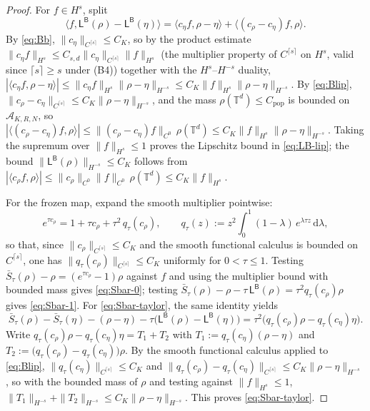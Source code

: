 \documentclass[a4paper,fleqn]{cas-sc}
\theoremstyle{definition}
\theoremstyle{remark}
\begin{document}
\begin{proof}
For $f\in H^s$, split
\[
\langle f,\mathsf L^{\mathsf B}(\rho)-\mathsf L^{\mathsf B}(\eta)\rangle
=\langle c_\eta f,\rho-\eta\rangle+\langle (c_\rho-c_\eta)f,\rho\rangle .
\]
By \eqref{eq:Bb}, $\|c_\eta\|_{C^{\lceil s\rceil}}\le C_K$, so by the product estimate
$\|c_\eta f\|_{H^s}\le C_{s,d}\|c_\eta\|_{C^{\lceil s\rceil}}\|f\|_{H^s}$ (the multiplier
property of $C^{\lceil s\rceil}$ on $H^s$, valid since $\lceil s\rceil\ge s$ under (B4))
together with the $H^s$--$H^{-s}$ duality,
$|\langle c_\eta f,\rho-\eta\rangle|\le\|c_\eta f\|_{H^s}\|\rho-\eta\|_{H^{-s}}\le C_K\|f\|_{H^s}\|\rho-\eta\|_{H^{-s}}$. By
\eqref{eq:Blip}, $\|c_\rho-c_\eta\|_{C^{\lceil s\rceil}}\le C_K\|\rho-\eta\|_{H^{-s}}$,
and the mass $\rho(\mathbb T^d)\le C_{\mathrm{pop}}$ is bounded on $\mathcal A_{K,R,N}$, so
$|\langle (c_\rho-c_\eta)f,\rho\rangle|\le\|(c_\rho-c_\eta)f\|_{C^0}\,\rho(\mathbb T^d)
\le C_K\|f\|_{H^s}\|\rho-\eta\|_{H^{-s}}$. Taking the supremum over $\|f\|_{H^s}\le1$
proves the Lipschitz bound in \eqref{eq:LB-lip}; the bound
$\|\mathsf L^{\mathsf B}(\rho)\|_{H^{-s}}\le C_K$ follows from
$|\langle c_\rho f,\rho\rangle|\le\|c_\rho\|_{C^0}\|f\|_{C^0}\,\rho(\mathbb T^d)\le C_K\|f\|_{H^s}$.

For the frozen map, expand the smooth multiplier pointwise:
\[
e^{\tau c_\rho}=1+\tau c_\rho+\tau^2\,q_\tau(c_\rho),
\qquad
q_\tau(z):=z^2\!\int_0^1(1-\lambda)\,e^{\lambda\tau z}\,\mathrm d\lambda,
\]
so that, since $\|c_\rho\|_{C^{\lceil s\rceil}}\le C_K$ and the smooth functional
calculus is bounded on $C^{\lceil s\rceil}$, one has
$\|q_\tau(c_\rho)\|_{C^{\lceil s\rceil}}\le C_K$ uniformly for $0<\tau\le1$. Testing
$\bar S_\tau(\rho)-\rho=(e^{\tau c_\rho}-1)\rho$ against $f$ and using the multiplier
bound with bounded mass gives \eqref{eq:Sbar-0}; testing
$\bar S_\tau(\rho)-\rho-\tau\,\mathsf L^{\mathsf B}(\rho)=\tau^2 q_\tau(c_\rho)\rho$
gives \eqref{eq:Sbar-1}. For \eqref{eq:Sbar-taylor}, the same identity yields
\[
\bar S_\tau(\rho)-\bar S_\tau(\eta)-(\rho-\eta)
-\tau\bigl(\mathsf L^{\mathsf B}(\rho)-\mathsf L^{\mathsf B}(\eta)\bigr)
=\tau^2\bigl(q_\tau(c_\rho)\rho-q_\tau(c_\eta)\eta\bigr).
\]
Write $q_\tau(c_\rho)\rho-q_\tau(c_\eta)\eta=T_1+T_2$ with $T_1:=q_\tau(c_\eta)(\rho-\eta)$ and
$T_2:=\bigl(q_\tau(c_\rho)-q_\tau(c_\eta)\bigr)\rho$. By the smooth functional calculus applied to
\eqref{eq:Blip}, $\|q_\tau(c_\eta)\|_{C^{\lceil s\rceil}}\le C_K$ and
$\|q_\tau(c_\rho)-q_\tau(c_\eta)\|_{C^{\lceil s\rceil}}\le C_K\|\rho-\eta\|_{H^{-s}}$, so with the bounded
mass of $\rho$ and testing against $\|f\|_{H^s}\le1$,
$\|T_1\|_{H^{-s}}+\|T_2\|_{H^{-s}}\le C_K\|\rho-\eta\|_{H^{-s}}$. This proves \eqref{eq:Sbar-taylor}.
\end{proof}
\end{document}
